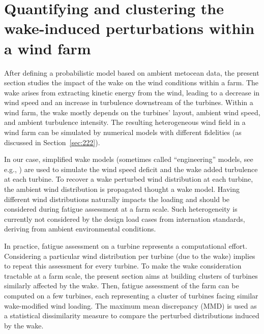 \section{Quantifying and clustering the wake-induced perturbations within a wind farm}

After defining a probabilistic model based on ambient metocean data, the present section studies the impact of the wake on the wind conditions within a farm. 
The wake arises from extracting kinetic energy from the wind, leading to a decrease in wind speed and an increase in turbulence downstream of the turbines. 
Within a wind farm, the wake mostly depends on the turbines' layout, ambient wind speed, and ambient turbulence intensity. 
The resulting heterogeneous wind field in a wind farm can be simulated by numerical models with different fidelities (as discussed in Section~\ref{sec:222}). 

In our case, simplified wake models (sometimes called ``engineering'' models, see e.g., \citealp{doubrawa_2020_benchmark}) are used to simulate the wind speed deficit and the wake added turbulence at each turbine.
To recover a wake perturbed wind distribution at each turbine, the ambient wind distribution is propagated thought a wake model. 
Having different wind distributions naturally impacts the loading and should be considered during fatigue assessment at a farm scale. 
Such heterogeneity is currently not considered by the design load cases from internation standards, deriving from ambient environmental conditions. 

In practice, fatigue assessment on a turbine represents a computational effort. 
Considering a particular wind distribution per turbine (due to the wake) implies to repeat this assessment for every turbine. 
To make the wake consideration tractable at a farm scale, the present section aims at building clusters of turbines similarly affected by the wake. 
Then, fatigue assessment of the farm can be computed on a few turbines, each representing a cluster of turbines facing similar wake-modified wind loading. 
The maximum mean discrepancy (MMD) is used as a statistical dissimilarity measure to compare the perturbed distributions induced by the wake. 

